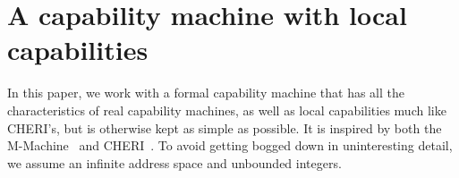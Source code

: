 \documentclass[compsoc,conference,letterpaper,fleqn]{IEEEtran}
\begin{document}



\section{A capability machine with local capabilities}
\label{sec:capab-mach-with}
In this paper, we work with a formal capability machine that has all the
characteristics of real capability machines, as well as local capabilities much
like CHERI's, but is otherwise kept as simple as possible. It is inspired by
both the M-Machine~\cite{Carter:1994:HSF:195473.195579} and
CHERI~\cite{Watson2015Cheri}. To avoid getting bogged down in uninteresting
detail, we assume an infinite address space and unbounded integers.
\end{document}
